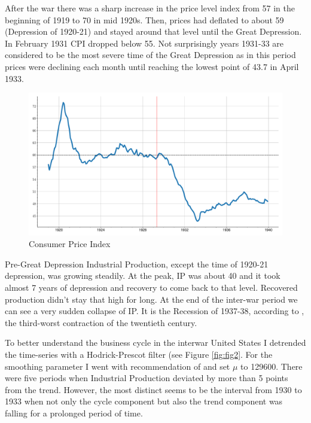 \documentclass[a4paper,12pt]{article}
\begin{document}
After the war there was a sharp increase in the price level index from 57 in the beginning of 1919 to 70 in mid 1920s. Then, prices had deflated to about 59 (Depression of 1920-21) and stayed around that level until the Great Depression. In February 1931 CPI dropped below 55. Not surprisingly years 1931-33 are considered to be the most severe time of the Great Depression as in this period prices were declining each month until reaching the lowest point of 43.7 in April 1933.

\begin{figure}[H]
    \centering
\caption{Consumer Price Index}
\label{fig:fig1}
    \includegraphics[width=\textwidth]{../output/figures/ts_CPI.pdf} 
\end{figure}

Pre-Great Depression Industrial Production, except the time of 1920-21 depression, was growing steadily. At the peak, IP was about 40 and it took almost 7 years of depression and recovery to come back to that level. Recovered production didn't stay that high for long. At the end of the inter-war period we can see a very sudden collapse of IP. It is the Recession of 1937-38, according to \cite{bordo2012}, the third-worst contraction of the twentieth century. 

To better understand the business cycle in the interwar United States I detrended the time-series with a Hodrick-Prescot filter (see Figure \ref{fig:fig2}. For the smoothing parameter I went with recommendation of \cite{morten1997} and set \(\mu\) to 129600. There were five periods when Industrial Production deviated by more than 5 points from the trend. However, the most distinct seems to be the interval from 1930 to 1933 when not only the cycle component but also the trend component was falling for a prolonged period of time. 
\end{document}

